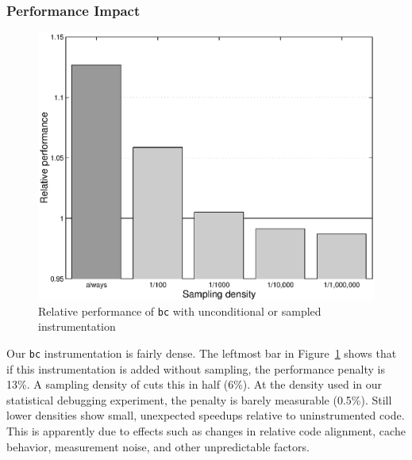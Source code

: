 \subsubsection{Performance Impact}

\begin{figure}
  \centering
  \small
  \includegraphics[width=\columnwidth]{applications/bc_density}
  \caption{Relative performance of \texttt{bc} with unconditional or
    sampled instrumentation}
  \label{fig:bc:slowdown}
\end{figure}

Our \texttt{bc} instrumentation is fairly dense.  The leftmost bar in
Figure~\ref{fig:bc:slowdown} shows that if this instrumentation is
added without sampling, the performance penalty is 
13\%.  A sampling density of  cuts this in
half (6\%).  At the  density used in our statistical
debugging experiment, the penalty is barely measurable (0.5\%).  Still
lower densities show small, unexpected speedups relative to
uninstrumented code.  This is apparently due to effects such as
changes in relative code alignment, cache behavior, measurement noise,
and other unpredictable factors.  


